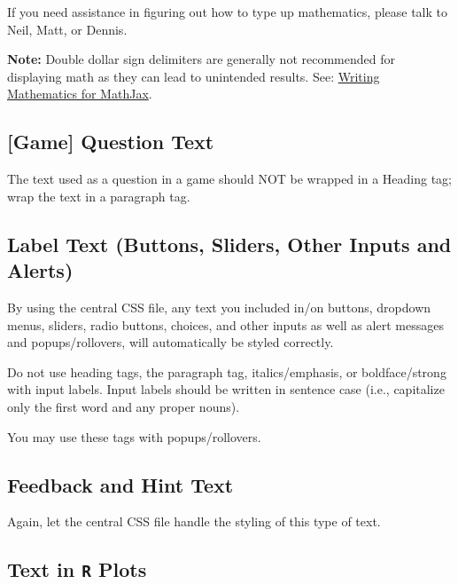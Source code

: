 \documentclass[
]{book}
\begin{document}
If you need assistance in figuring out how to type up mathematics, please talk to Neil, Matt, or Dennis.

\textbf{Note:} Double dollar sign delimiters are generally not recommended for displaying math as they can lead to unintended results. See: \href{https://docs.mathjax.org/en/latest/basic/mathematics.html}{Writing Mathematics for MathJax}.

\hypertarget{game-question-text}{%
\subsection{{[}Game{]} Question Text}\label{game-question-text}}

The text used as a question in a game should NOT be wrapped in a Heading tag; wrap the text in a paragraph tag.

\hypertarget{label-text-buttons-sliders-other-inputs-and-alerts}{%
\subsection{Label Text (Buttons, Sliders, Other Inputs and Alerts)}\label{label-text-buttons-sliders-other-inputs-and-alerts}}

By using the central CSS file, any text you included in/on buttons, dropdown menus, sliders, radio buttons, choices, and other inputs as well as alert messages and popups/rollovers, will automatically be styled correctly.

Do not use heading tags, the paragraph tag, italics/emphasis, or boldface/strong with input labels. Input labels should be written in sentence case (i.e., capitalize only the first word and any proper nouns).

You may use these tags with popups/rollovers.

\hypertarget{feedback-and-hint-text}{%
\subsection{Feedback and Hint Text}\label{feedback-and-hint-text}}

Again, let the central CSS file handle the styling of this type of text.

\hypertarget{text-in-r-plots}{%
\subsection{\texorpdfstring{Text in \texttt{R} Plots}{Text in R Plots}}\label{text-in-r-plots}}
\end{document}
